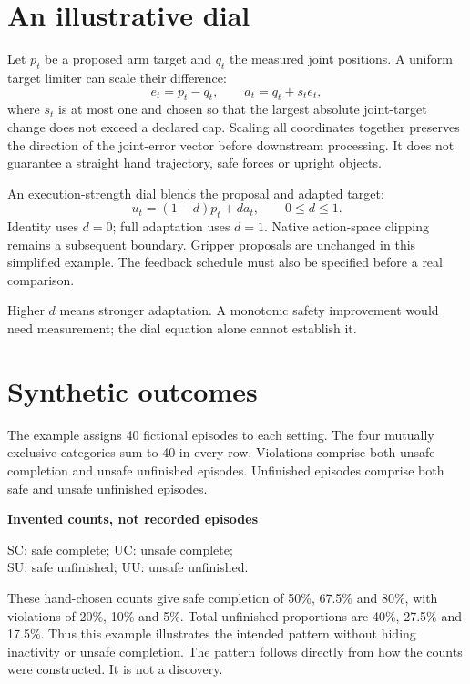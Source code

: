 \documentclass[10pt,a4paper,twocolumn]{article}
\begin{document}
\section{An illustrative dial}
Let $p_t$ be a proposed arm target and $q_t$ the measured joint positions. A uniform
target limiter can scale their difference:
\[
 e_t=p_t-q_t,\qquad a_t=q_t+s_te_t,
\]
where $s_t$ is at most one and chosen so that the largest absolute joint-target
change does not exceed a declared cap. Scaling all coordinates together preserves
the direction of the joint-error vector before downstream processing. It does not
guarantee a straight hand trajectory, safe forces or upright objects.

An execution-strength dial blends the proposal and adapted target:
\[
 u_t=(1-d)p_t+d a_t,\qquad 0\le d\le1.
\]
Identity uses $d=0$; full adaptation uses $d=1$. Native action-space clipping remains
a subsequent boundary. Gripper proposals are unchanged in this simplified example.
The feedback schedule must also be specified before a real comparison.

Higher $d$ means stronger adaptation. A monotonic safety improvement would need
measurement; the dial equation alone cannot establish it.

\section{Synthetic outcomes}
The example assigns 40 fictional episodes to each setting. The four mutually
exclusive categories sum to 40 in every row. Violations comprise both unsafe
completion and unsafe unfinished episodes. Unfinished episodes comprise both safe
and unsafe unfinished episodes.

\begin{center}
\small
\textbf{Invented counts, not recorded episodes}\par\smallskip

\par\smallskip
\footnotesize SC: safe complete; UC: unsafe complete;\\
SU: safe unfinished; UU: unsafe unfinished.
\end{center}

These hand-chosen counts give safe completion of 50\%, 67.5\% and 80\%, with
violations of 20\%, 10\% and 5\%. Total unfinished proportions are 40\%, 27.5\%
and 17.5\%. Thus this example illustrates the intended pattern without hiding
inactivity or unsafe completion. The pattern follows directly from how the counts
were constructed. It is not a discovery.
\end{document}
